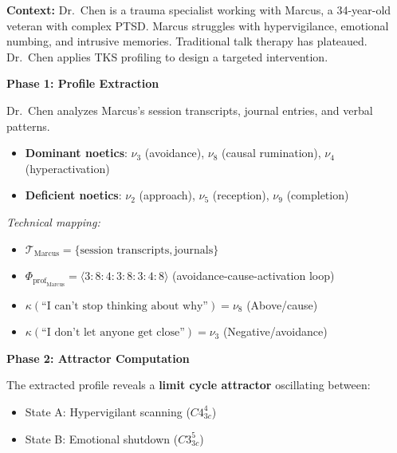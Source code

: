 \documentclass[11pt,twoside]{book}
\newcommand{\noe}[1]{\nu_{#1}}
\newcommand{\ProfileFrac}{\Phi_{\mathrm{prof}}}
\newcommand{\TextCorpus}{\mathcal{T}}
\begin{document}
\begin{tcolorbox}[colback=yellow!5!white,colframe=yellow!65!black,title=\textbf{Scenario 1: Therapeutic Application --- Trauma Patient},breakable]

\textbf{Context:}
Dr.\ Chen is a trauma specialist working with Marcus, a 34-year-old veteran with complex PTSD.
Marcus struggles with hypervigilance, emotional numbing, and intrusive memories. Traditional
talk therapy has plateaued. Dr.\ Chen applies TKS profiling to design a targeted intervention.

\textbf{Phase 1: Profile Extraction}

Dr.\ Chen analyzes Marcus's session transcripts, journal entries, and verbal patterns.
\begin{itemize}
    \item \textbf{Dominant noetics}: $\noe{3}$ (avoidance), $\noe{8}$ (causal rumination),
          $\noe{4}$ (hyperactivation)
    \item \textbf{Deficient noetics}: $\noe{2}$ (approach), $\noe{5}$ (reception),
          $\noe{9}$ (completion)
\end{itemize}

\textit{Technical mapping:}
\begin{itemize}
    \item $\TextCorpus_{\mathrm{Marcus}} = \{\text{session transcripts}, \text{journals}\}$
    \item $\ProfileFrac_{\mathrm{Marcus}} = \langle 3:8:4:3:8:3:4:8 \rangle$ (avoidance-cause-activation loop)
    \item $\kappa(\text{``I can't stop thinking about why''}) = \noe{8}$ (Above/cause)
    \item $\kappa(\text{``I don't let anyone get close''}) = \noe{3}$ (Negative/avoidance)
\end{itemize}

\textbf{Phase 2: Attractor Computation}

The extracted profile reveals a \textbf{limit cycle attractor} oscillating between:
\begin{itemize}
    \item State A: Hypervigilant scanning ($C4^4_{3c}$)
    \item State B: Emotional shutdown ($C3^5_{3c}$)
\end{itemize}


\end{tcolorbox}
\end{document}
